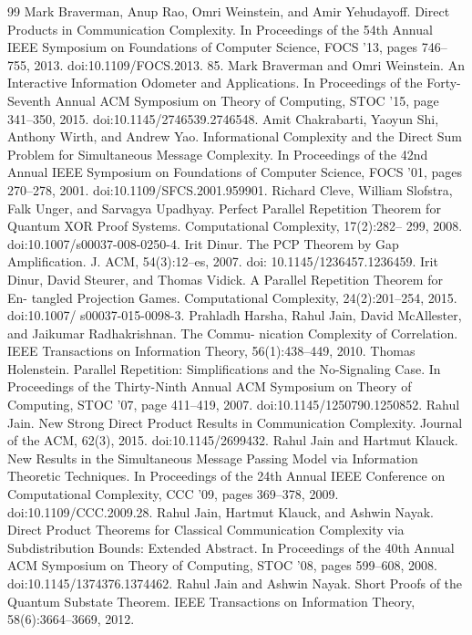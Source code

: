 \begin{thebibliography}{99}
 Mark Braverman, Anup Rao, Omri Weinstein, and Amir Yehudayoff. Direct Products in Communication Complexity. In Proceedings of the 54th Annual IEEE Symposium on Foundations of Computer Science, FOCS ’13, pages 746–755, 2013. doi:10.1109/FOCS.2013. 85.
 Mark Braverman and Omri Weinstein. An Interactive Information Odometer and Applications. In Proceedings of the Forty-Seventh Annual ACM Symposium on Theory of Computing, STOC ’15, page 341–350, 2015. doi:10.1145/2746539.2746548.
 Amit Chakrabarti, Yaoyun Shi, Anthony Wirth, and Andrew Yao. Informational Complexity and the Direct Sum Problem for Simultaneous Message Complexity. In Proceedings of the 42nd Annual IEEE Symposium on Foundations of Computer Science, FOCS ’01, pages 270–278, 2001. doi:10.1109/SFCS.2001.959901.
 Richard Cleve, William Slofstra, Falk Unger, and Sarvagya Upadhyay. Perfect Parallel Repetition Theorem for Quantum XOR Proof Systems. Computational Complexity, 17(2):282– 299, 2008. doi:10.1007/s00037-008-0250-4.
 Irit Dinur. The PCP Theorem by Gap Amplification. J. ACM, 54(3):12–es, 2007. doi: 10.1145/1236457.1236459.
 Irit Dinur, David Steurer, and Thomas Vidick. A Parallel Repetition Theorem for En- tangled Projection Games. Computational Complexity, 24(2):201–254, 2015. doi:10.1007/ s00037-015-0098-3.
 Prahladh Harsha, Rahul Jain, David McAllester, and Jaikumar Radhakrishnan. The Commu- nication Complexity of Correlation. IEEE Transactions on Information Theory, 56(1):438–449, 2010.
 Thomas Holenstein. Parallel Repetition: Simplifications and the No-Signaling Case. In Proceedings of the Thirty-Ninth Annual ACM Symposium on Theory of Computing, STOC ’07, page 411–419, 2007. doi:10.1145/1250790.1250852.
 Rahul Jain. New Strong Direct Product Results in Communication Complexity. Journal of the ACM, 62(3), 2015. doi:10.1145/2699432.
 Rahul Jain and Hartmut Klauck. New Results in the Simultaneous Message Passing Model via Information Theoretic Techniques. In Proceedings of the 24th Annual IEEE Conference on Computational Complexity, CCC ’09, pages 369–378, 2009. doi:10.1109/CCC.2009.28.
 Rahul Jain, Hartmut Klauck, and Ashwin Nayak. Direct Product Theorems for Classical Communication Complexity via Subdistribution Bounds: Extended Abstract. In Proceedings of the 40th Annual ACM Symposium on Theory of Computing, STOC ’08, pages 599–608, 2008. doi:10.1145/1374376.1374462.
 Rahul Jain and Ashwin Nayak. Short Proofs of the Quantum Substate Theorem. IEEE Transactions on Information Theory, 58(6):3664–3669, 2012.

\end{thebibliography}
